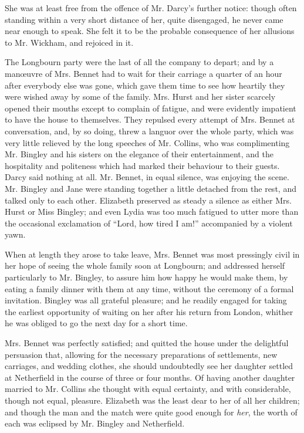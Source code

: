 She was at least free from the offence of Mr. Darcy's further notice: though often standing within a very short distance of her, quite disengaged, he never came near enough to speak. She felt it to be the probable consequence of her allusions to Mr. Wickham, and rejoiced in it.

The Longbourn party were the last of all the company to depart; and by a manœuvre of Mrs. Bennet had to wait for their carriage a quarter of an hour after everybody else was gone, which gave them time to see how heartily they were wished away by some of the family. Mrs. Hurst and her sister scarcely opened their mouths except to complain of fatigue, and were evidently impatient to have the house to themselves. They repulsed every attempt of Mrs. Bennet at conversation, and, by so doing, threw a languor over the whole party, which was very little relieved by the long speeches of Mr. Collins, who was complimenting Mr. Bingley and his sisters on the elegance of their entertainment, and the hospitality and politeness which had marked their behaviour to their guests. Darcy said nothing at all. Mr. Bennet, in equal silence, was enjoying the scene. Mr. Bingley and Jane were standing together a little detached from the rest, and talked only to each other. Elizabeth preserved as steady a silence as either Mrs. Hurst or Miss Bingley; and even Lydia was too much fatigued to utter more than the occasional exclamation of ``Lord, how tired I am!'' accompanied by a violent yawn.

When at length they arose to take leave, Mrs. Bennet was most pressingly civil in her hope of seeing the whole family soon at Longbourn; and addressed herself particularly to Mr. Bingley, to assure him how happy he would make them, by eating a family dinner with them at any time, without the ceremony of a formal invitation. Bingley was all grateful pleasure; and he readily engaged for taking the earliest opportunity of waiting on her after his return from London, whither he was obliged to go the next day for a short time.

Mrs. Bennet was perfectly satisfied; and quitted the house under the delightful persuasion that, allowing for the necessary preparations of settlements, new carriages, and wedding clothes, she should undoubtedly see her daughter settled at Netherfield in the course of three or four months. Of having another daughter married to Mr. Collins she thought with equal certainty, and with considerable, though not equal, pleasure. Elizabeth was the least dear to her of all her children; and though the man and the match were quite good enough for \textit{her}, the worth of each was eclipsed by Mr. Bingley and Netherfield.



